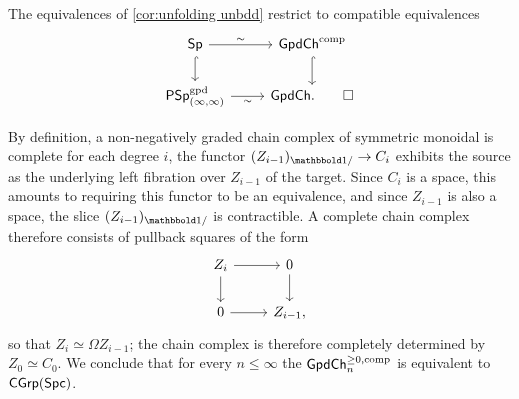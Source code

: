 \documentclass[a4paper,11pt]{article}
\begin{document}
\begin{cornoproof}
  The equivalences of \cref{cor:unfolding unbdd} restrict to
  compatible equivalences
  \[
    \begin{tikzcd}
     \Sp \ar[r, "\sim"] \ar[d, hookrightarrow] & \GpdChc  \ar[d, hookrightarrow] \\
     \PSpIIgpd \ar[r, "\sim"'] & \GpdCh. \qedhere
    \end{tikzcd}
  \]
\end{cornoproof}

\begin{observation}
  By definition, a non-negatively graded chain complex of symmetric monoidal \igpds{}
  is complete \IFF{} for each degree $i$, the functor
  $(Z_{i-1})_{\bbone/} \to C_{i}$ exhibits the source as the
  underlying left fibration over $Z_{i-1}$ of the target. Since
  $C_{i}$ is a space, this amounts to requiring this functor to be an
  equivalence, and since $Z_{i-1}$ is also a space, the slice
  $(Z_{i-1})_{\bbone/}$ is contractible. A complete chain complex
  therefore consists of pullback squares of the form
  \[
    \begin{tikzcd}
     Z_{i} \ar[r] \ar[d] & 0  \ar[d] \\
     0 \ar[r] & Z_{i-1},
    \end{tikzcd}
  \]
  so that $Z_{i} \simeq \Omega Z_{i-1}$; the chain complex is
  therefore completely determined by $Z_{0} \simeq C_{0}$. We conclude that
  for every $n \leq \infty$ the \icat{} $\textup{\textsf{GpdCh}}^{\geq 0,\text{\textup{comp}}}_{n}$ is
  equivalent to $\textup{\textsf{CGrp}}(\textup{\textsf{Spc}})$.
\end{observation}
\end{document}
